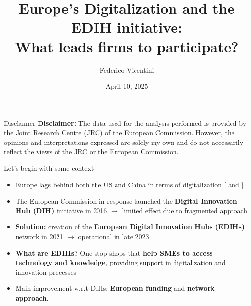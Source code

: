 \documentclass{beamer}
\title{Europe's Digitalization and the EDIH initiative: \\What leads firms to participate?}
\author{Federico Vicentini}
\institute{Università Cattolica del Sacro Cuore\\
Department of Economics}
\date{April 10, 2025}
\begin{document}
\begin{frame}
    \titlepage
\end{frame}





\begin{frame}{Disclaimer}
    \textbf{Disclaimer:} The data used for the analysis performed is provided by the Joint Research Centre (JRC) of the European Commission. However, the opinions and interpretations expressed are solely my own and do not necessarily reflect the views of the JRC or the European Commission.
\end{frame}


\begin{frame}{Let's begin with some context}
    \begin{itemize}
        \item Europe lags behind both the US and China in terms of digitalization [\cite{digital_europe_programme} and \cite{draghi2024}]
        \item The European Commission in response launched the \textbf{Digital Innovation Hub (DIH)} initiative in 2016 $\to$ limited effect due to fragmented approach
        \item \textbf{Solution:} creation of the \textbf{European Digital Innovation Hubs (EDIHs)} network in 2021 $\to$ operational in late 2023
        \item \textbf{What are EDIHs?} One-stop shops that \textbf{help SMEs to access technology and knowledge}, providing support in digitalization and innovation processes
        \item Main improvement w.r.t DIHs: \textbf{European funding} and \textbf{network approach}.
    \end{itemize}
\end{frame}
\end{document}
